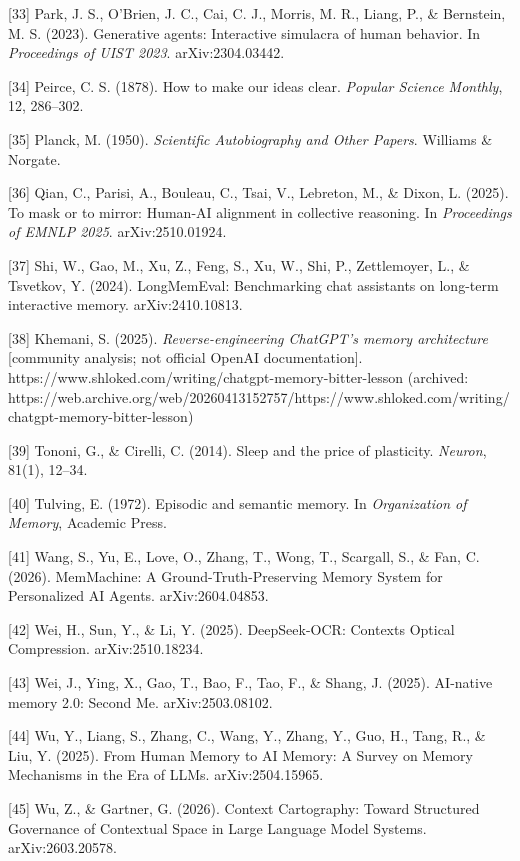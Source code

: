 \documentclass[
  11pt,
]{article}
\begin{document}
{[}33{]} Park, J. S., O'Brien, J. C., Cai, C. J., Morris, M. R., Liang,
P., \& Bernstein, M. S. (2023). Generative agents: Interactive simulacra
of human behavior. In \emph{Proceedings of UIST 2023}. arXiv:2304.03442.

{[}34{]} Peirce, C. S. (1878). How to make our ideas clear.
\emph{Popular Science Monthly}, 12, 286--302.

{[}35{]} Planck, M. (1950). \emph{Scientific Autobiography and Other
Papers}. Williams \& Norgate.

{[}36{]} Qian, C., Parisi, A., Bouleau, C., Tsai, V., Lebreton, M., \&
Dixon, L. (2025). To mask or to mirror: Human-AI alignment in collective
reasoning. In \emph{Proceedings of EMNLP 2025}. arXiv:2510.01924.

{[}37{]} Shi, W., Gao, M., Xu, Z., Feng, S., Xu, W., Shi, P.,
Zettlemoyer, L., \& Tsvetkov, Y. (2024). LongMemEval: Benchmarking chat
assistants on long-term interactive memory. arXiv:2410.10813.

{[}38{]} Khemani, S. (2025). \emph{Reverse-engineering ChatGPT's memory
architecture} {[}community analysis; not official OpenAI
documentation{]}.
https://www.shloked.com/writing/chatgpt-memory-bitter-lesson (archived:
https://web.archive.org/web/20260413152757/https://www.shloked.com/writing/chatgpt-memory-bitter-lesson)

{[}39{]} Tononi, G., \& Cirelli, C. (2014). Sleep and the price of
plasticity. \emph{Neuron}, 81(1), 12--34.

{[}40{]} Tulving, E. (1972). Episodic and semantic memory. In
\emph{Organization of Memory}, Academic Press.

{[}41{]} Wang, S., Yu, E., Love, O., Zhang, T., Wong, T., Scargall, S.,
\& Fan, C. (2026). MemMachine: A Ground-Truth-Preserving Memory System
for Personalized AI Agents. arXiv:2604.04853.

{[}42{]} Wei, H., Sun, Y., \& Li, Y. (2025). DeepSeek-OCR: Contexts
Optical Compression. arXiv:2510.18234.

{[}43{]} Wei, J., Ying, X., Gao, T., Bao, F., Tao, F., \& Shang, J.
(2025). AI-native memory 2.0: Second Me. arXiv:2503.08102.

{[}44{]} Wu, Y., Liang, S., Zhang, C., Wang, Y., Zhang, Y., Guo, H.,
Tang, R., \& Liu, Y. (2025). From Human Memory to AI Memory: A Survey on
Memory Mechanisms in the Era of LLMs. arXiv:2504.15965.

{[}45{]} Wu, Z., \& Gartner, G. (2026). Context Cartography: Toward
Structured Governance of Contextual Space in Large Language Model
Systems. arXiv:2603.20578.
\end{document}
